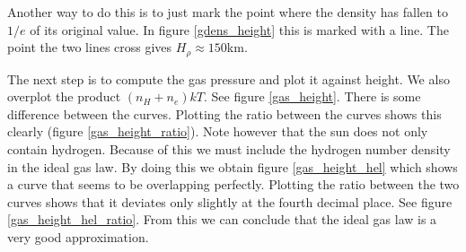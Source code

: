 \documentclass{aa}   %
\begin{document}
Another way to do this is to just mark the point where the density has fallen to $1/e$ of its original value. In figure \ref{gdens_height} this is marked with a line. The point the two lines cross gives $H_\rho \approx 150 $km.


The next step is to compute the gas pressure and plot it against height. We also overplot the product $(n_H + n_e)kT$. See figure \ref{gas_height}. There is some difference between the curves. Plotting the ratio between the curves shows this clearly (figure \ref{gas_height_ratio}). Note however that the sun does not only contain hydrogen. Because of this we must include the hydrogen number density in the ideal gas law. By doing this we obtain figure \ref{gas_height_hel} which shows a curve that seems to be overlapping perfectly. Plotting the ratio between the two curves shows that it deviates only slightly at the fourth decimal place. See figure \ref{gas_height_hel_ratio}. From this we can conclude that the ideal gas law is a very good approximation.




\end{document}
